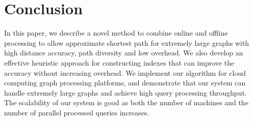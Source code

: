 \section{Conclusion}
\label{conclusion}

In this paper, we describe a novel method to combine online and offline processing to allow approximate shortest path for extremely large graphs with high distance accuracy, path diversity and low overhead. 
We also develop an effective heuristic approach for constructing indexes that can improve the accuracy without increasing overhead. We implement our algorithm for cloud computing graph processing platforms, and demonstrate that our system can handle extremely large graphs and achieve high query processing throughput. The scalability of our system is good as both the number of machines and the number of parallel processed queries increases. 
